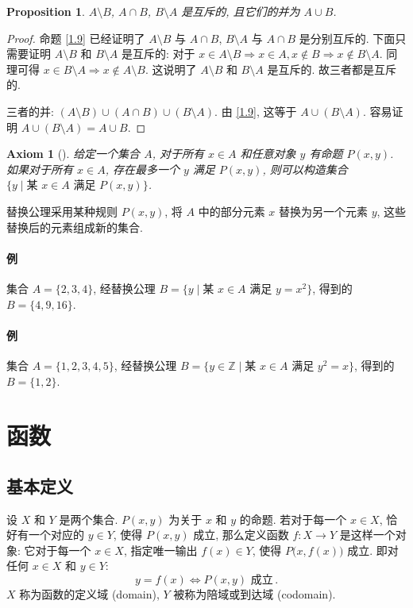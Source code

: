 \documentclass[UTF8]{ctexart}
\theoremstyle{mystyle}
\newtheorem{axiom}{Axiom}[section]
\newtheorem{proposition}{Proposition}[section]
\theoremstyle{myremark}
\theoremstyle{plain}
\newcommand{\Z}{\mathbb Z}
\begin{document}
\begin{proposition} \label{1.10}
    $ A \setminus B $, $ A \cap B $, $ B \setminus A $ 是互斥的, 且它们的并为 $ A \cup B $.
\end{proposition}

\begin{proof}
    命题 \ref{1.9} 已经证明了 $ A \setminus B $ 与 $ A \cap B $, $ B \setminus A $ 与 $ A \cap B $ 是分别互斥的. 下面只需要证明 $ A \setminus B $ 和 $ B \setminus A $ 是互斥的: 对于 $ x \in A \setminus B \Longrightarrow x \in A, x \notin B \Longrightarrow x \notin B \setminus A $. 同理可得 $ x \in B \setminus A \Longrightarrow x \notin A \setminus B $. 这说明了 $ A \setminus B $ 和 $ B \setminus A $ 是互斥的. 故三者都是互斥的.

    三者的并: $ (A \setminus B) \cup (A \cap B) \cup (B \setminus A) $. 由 \ref{1.9}, 这等于 $ A \cup (B \setminus A) $. 容易证明 $ A \cup (B \setminus A) = A \cup B $.
\end{proof}


\begin{axiom}[]
    给定一个集合 $ A $, 对于所有 $ x \in A $ 和任意对象 $ y $ 有命题 $ P(x, y) $. 如果对于所有 $ x \in A $, 存在最多一个 $ y $ 满足 $ P(x, y) $, 则可以构造集合 $ \{ y \mid \text{某 } x \in A \text{ 满足 } P(x, y) \} $.
\end{axiom}

替换公理采用某种规则 $ P(x, y) $, 将 $ A $ 中的部分元素 $ x $ 替换为另一个元素 $ y $, 这些替换后的元素组成新的集合.

\paragraph{例} 
集合 $ A = \{2, 3, 4\} $, 经替换公理 $ B = \{y \mid \text{某 } x \in A \text{ 满足 } y = x^2 \} $, 得到的 $ B = \{4, 9, 16\} $.

\paragraph{例} 
集合 $ A = \{1, 2, 3, 4, 5\} $, 经替换公理 $ B = \{y \in \Z \mid \text{某 } x \in A \text{ 满足 } y^2 = x \} $, 得到的 $ B = \{1, 2\} $.


\section{函数}
\subsection{基本定义}
\begin{definition}[\text{函数}]
    设 $ X $ 和 $ Y $ 是两个集合. $ P(x, y) $ 为关于 $ x $ 和 $ y $ 的命题. 若对于每一个 $ x \in X $, 恰好有一个对应的 $ y \in Y $, 使得 $ P(x, y) $ 成立, 那么定义函数 $ f \colon X \to Y $ 是这样一个对象: 它对于每一个 $ x \in X $, 指定唯一输出 $ f(x) \in Y $, 使得 $ P \big( x, f(x) \big) $ 成立. 即对任何 $ x \in X $ 和 $ y \in Y $: \[ y = f(x) \Longleftrightarrow P(x, y) \text{ 成立} \,.\] $ X $ 称为函数的定义域 (domain), $ Y $ 被称为陪域或到达域 (codomain).
\end{definition}
\end{document}
